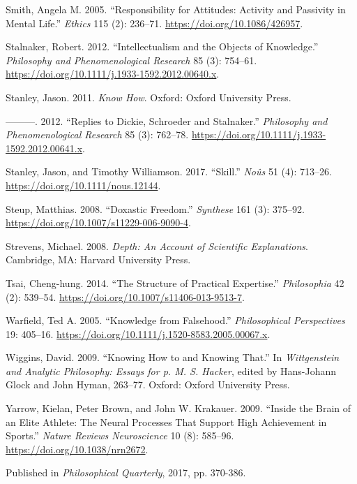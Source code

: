 \documentclass[
  11pt,
  letterpaper,
  DIV=11,
  numbers=noendperiod,
  oneside]{scrartcl}
\newlength{\cslhangindent}
\newenvironment{CSLReferences}[2] %
 {\begin{list}{}{%
  \setlength{\itemindent}{0pt}
  \setlength{\leftmargin}{0pt}
  \setlength{\parsep}{0pt}
  \ifodd #1
   \setlength{\leftmargin}{\cslhangindent}
   \setlength{\itemindent}{-1\cslhangindent}
  \fi
  \setlength{\itemsep}{#2\baselineskip}}}
 {\end{list}}
\begin{document}
\begin{CSLReferences}{1}{0}
Smith, Angela M. 2005. {``Responsibility for Attitudes: Activity and
Passivity in Mental Life.''} \emph{Ethics} 115 (2): 236--71.
\url{https://doi.org/10.1086/426957}.

Stalnaker, Robert. 2012. {``Intellectualism and the Objects of
Knowledge.''} \emph{Philosophy and Phenomenological Research} 85 (3):
754--61. \url{https://doi.org/10.1111/j.1933-1592.2012.00640.x}.

Stanley, Jason. 2011. \emph{Know How}. Oxford: Oxford University Press.

---------. 2012. {``Replies to Dickie, Schroeder and Stalnaker.''}
\emph{Philosophy and Phenomenological Research} 85 (3): 762--78.
\url{https://doi.org/10.1111/j.1933-1592.2012.00641.x}.

Stanley, Jason, and Timothy Williamson. 2017. {``Skill.''} \emph{No{û}s}
51 (4): 713--26. \url{https://doi.org/10.1111/nous.12144}.

Steup, Matthias. 2008. {``Doxastic Freedom.''} \emph{Synthese} 161 (3):
375--92. \url{https://doi.org/10.1007/s11229-006-9090-4}.

Strevens, Michael. 2008. \emph{Depth: An Account of Scientific
Explanations}. Cambridge, MA: Harvard University Press.

Tsai, Cheng-hung. 2014. {``The Structure of Practical Expertise.''}
\emph{Philosophia} 42 (2): 539--54.
\url{https://doi.org/10.1007/s11406-013-9513-7}.

Warfield, Ted A. 2005. {``Knowledge from Falsehood.''}
\emph{Philosophical Perspectives} 19: 405--16.
\url{https://doi.org/10.1111/j.1520-8583.2005.00067.x}.

Wiggins, David. 2009. {``Knowing How to and Knowing That.''} In
\emph{Wittgenstein and Analytic Philosophy: Essays for p. M. S. Hacker},
edited by Hans-Johann Glock and John Hyman, 263--77. Oxford: Oxford
University Press.

Yarrow, Kielan, Peter Brown, and John W. Krakauer. 2009. {``Inside the
Brain of an Elite Athlete: The Neural Processes That Support High
Achievement in Sports.''} \emph{Nature Reviews Neuroscience} 10 (8):
585--96. \url{https://doi.org/10.1038/nrn2672}.

\end{CSLReferences}



Published in\emph{
Philosophical Quarterly}, 2017, pp. 370-386.
\end{document}
